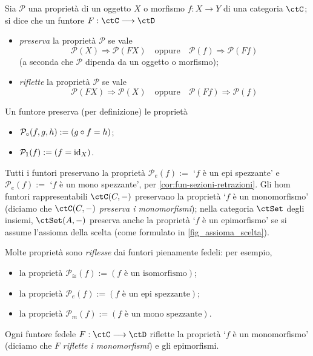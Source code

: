 \begin{definition}\label{def_preserva_riflette}
	Sia \(\mathcal{P}\) una proprietà di un oggetto \(X\) o morfismo \(f : X\to Y\) di una categoria \(\ctC\); si dice che un funtore \(F : \ctC \fun\ctD\)
	\begin{itemize}
		\item \emph{preserva} la proprietà \(\mathcal{P}\) se vale
		      \[\mathcal{P}(X) \Rightarrow \mathcal{P}(FX) \quad \text{oppure} \quad
			      \mathcal{P}(f) \Rightarrow \mathcal{P}(Ff) \]
		      (a seconda che \(\mathcal P\) dipenda da un oggetto o morfismo);
		\item \emph{riflette} la proprietà \(\mathcal{P}\) se vale
		      \[\mathcal{P}(FX) \Rightarrow \mathcal{P}(X) \quad \text{oppure} \quad
			      \mathcal{P}(Ff) \Rightarrow \mathcal{P}(f) \]
	\end{itemize}
	Un funtore preserva (per definizione) le proprietà
	\begin{itemize}
		\item \(\mathcal P_\circ(f,g,h) := (g\circ f = h)\);
		\item \(\mathcal P_1(f) := (f = \mathrm{id}_X)\).
	\end{itemize}
\end{definition}
\begin{proposition}\label{prop_preserva_riflette}
	Tutti i funtori preservano la proprietà \(\mathcal P_e(f) :=\) `\(f\) è un epi spezzante' e \(\mathcal P_e(f) :=\) `\(f\) è un mono spezzante', per \ref{cor:fun-sezioni-retrazioni}. Gli hom funtori rappresentabili \(\Hom\ctC(C,-)\) preservano la proprietà `\(f\) è un monomorfismo' (diciamo che \(\Hom\ctC(C,-)\) \emph{preserva i monomorfismi}); nella categoria \(\ctSet\) degli insiemi, \(\Hom\ctSet(A,-)\) preserva anche la proprietà `\(f\) è un epimorfismo' se si assume l'assioma della scelta (come formulato in \ref{fig_assioma_scelta}).

	Molte proprietà sono \emph{riflesse} dai funtori pienamente fedeli: per esempio,
	\begin{itemize}
		\item la proprietà \(\mathcal P_\cong(f) := (f \text{ è un isomorfismo})\);
		\item la proprietà \(\mathcal P_e(f) := (f \text{ è un epi spezzante})\);
		\item la proprietà \(\mathcal P_m(f) := (f \text{ è un mono spezzante})\).
	\end{itemize}
	Ogni funtore fedele \(F : \ctC\fun\ctD\) riflette la proprietà `\(f\) è un monomorfismo' (diciamo che \(F\) \emph{riflette i monomorfismi}) e gli epimorfismi.
\end{proposition}
